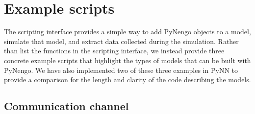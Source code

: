 \documentclass{frontiersSCNS}
\begin{document}
\section{Example scripts} \label{sec:examples}

The scripting interface provides
a simple way to add PyNengo objects to a model,
simulate that model,
and extract data collected during the simulation.
Rather than list the functions in the scripting interface,
we instead provide three concrete example scripts
that highlight the types of models that can be
built with PyNengo.
We have also implemented two of these three examples
in PyNN to provide a comparison
for the length and clarity of the code
describing the models.

\subsection{Communication channel} \label{sec:comm-channel}
\end{document}
